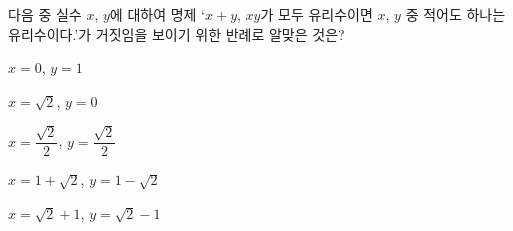 다음 중 실수 $x$, $y$에 대하여 명제 ‘$x+y$, $xy$가 모두 유리수이면 $x$, $y$ 중 적어도 하나는 유리수이다.’가 거짓임을 보이기 위한 반례로 알맞은 것은?
\begin{choicesii}{\rule[-3ex]{0pt}{8ex}$x=0$, $y=1$}{\rule[-3ex]{0pt}{8ex}$x=\sqrt{2}$, $y=0$}{\rule[-3ex]{0pt}{8ex}$x=\dfrac{\sqrt{2}}{2}$, $y=\dfrac{\sqrt{2}}{2}$}{\rule[-3ex]{0pt}{8ex}$x=1+\sqrt{2}$, $y=1-\sqrt{2}$}{\rule[-3ex]{0pt}{8ex}$x=\sqrt{2}+1$, $y=\sqrt{2}-1$}\end{choicesii}
